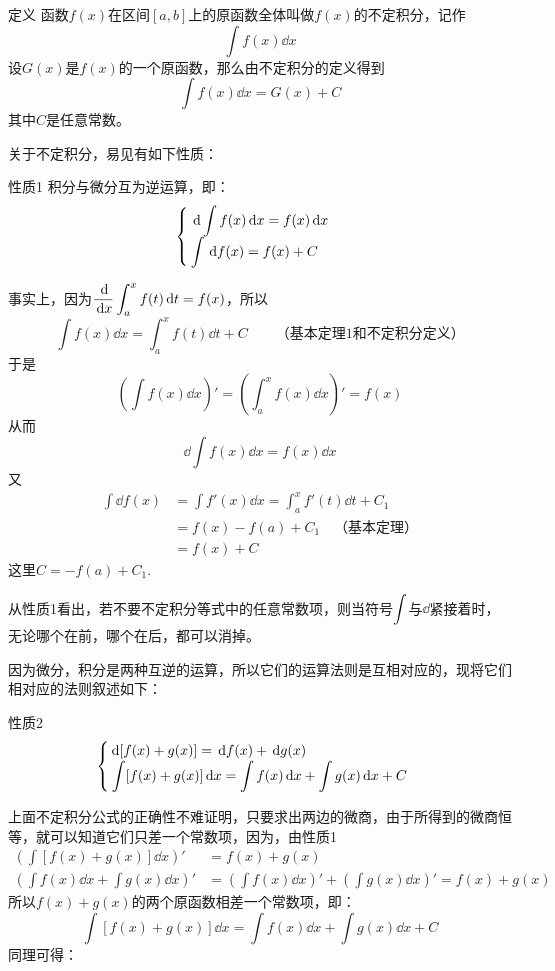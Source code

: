 \begin{blk}
   {定义} 函数$f(x)$在区间$[a,b]$上的原函数全体叫做$f(x)$的不定积分，记作
   \[\int f(x)\dd x\]
   设$G(x)$是$f(x)$的一个原函数，那么由不定积分的定义得到
\[\int f (x) \dd x=G (x) +C\]
   其中$C$是任意常数。
\end{blk}   

关于不定积分，易见有如下性质：

\begin{blk}{性质1}
   积分与微分互为逆运算，即：
\[\begin{cases}
    \,{\rm d}\displaystyle\int f(x)\,{\rm d} x=f(x)\,{\rm d} x\\
    \displaystyle\int \,{\rm d} f(x)=f(x)+C
\end{cases}\]
\end{blk}

事实上，因为$\dfrac{\,{\rm d} }{\,{\rm d} x}\displaystyle\int^x_a f(t)\,{\rm d} t=f(x)$，所以
\[\int f(x)\dd x=\int^x_a f(t)\dd t+C\qquad \text{（基本定理1和不定积分定义）}\]
于是
\[\left(\int f(x)\dd x\right)'=\left(\int^x_a f(x)\dd x\right)'=f(x)\]
从而
\[\dd\int f(x)\dd x=f(x)\dd x\]
又
\[\begin{split}
    \int \dd f(x)&=\int f'(x)\dd x=\int^x_a f'(t)\dd t+C_1\\
    &=f(x)-f(a)+C_1\quad \text{（基本定理）}\\
    &=f(x)+C
\end{split}\]
这里$C=-f(a)+C_1$. 

从性质1看出，若不要不定积分等式中的任意常数项，则当符号$\displaystyle\int$与$\dd$紧接着时，无论哪个在前，哪个在后，都可以消掉。

因为微分，积分是两种互逆的运算，所以它们的运算法则是互相对应的，现将它们相对应的法则叙述如下：

\begin{blk}{性质2}
 \[\begin{cases}
     {\rm d} [f(x)+g(x)]=\,{\rm d} f(x)+\,{\rm d} g(x)\\
     \displaystyle\int [f(x)+g(x)] \,{\rm d} x=\displaystyle\int f(x)\,{\rm d} x+\displaystyle\int g(x)\,{\rm d} x+C
 \end{cases}\]
 \end{blk}

 上面不定积分公式的正确性不难证明，只要求出两边的微商，由于所得到的微商恒等，就可以知道它们只差一个常数项，因为，由性质1
\[\begin{split}
    \left(\int[f(x)+g(x)]\dd x\right)'&=f(x)+g(x)\\
    \left(\int f(x)\dd x+\int g(x)\dd x\right)'&=\left(\int f(x)\dd x\right)'+\left(\int g(x)\dd x\right)'=f(x)+g(x)
\end{split}\]
所以$f(x)+g(x)$的两个原函数相差一个常数项，即：
\[\int[f(x)+g(x)]\dd x=\int f(x)\dd x+\int g(x)\dd x+C\]
同理可得：

